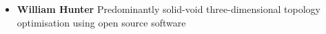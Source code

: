 \begin{frame}
\begin{itemize}
\item \textbf{William Hunter} Predominantly solid-void three-dimensional topology optimisation using open source software
\end{itemize}

\end{frame}
